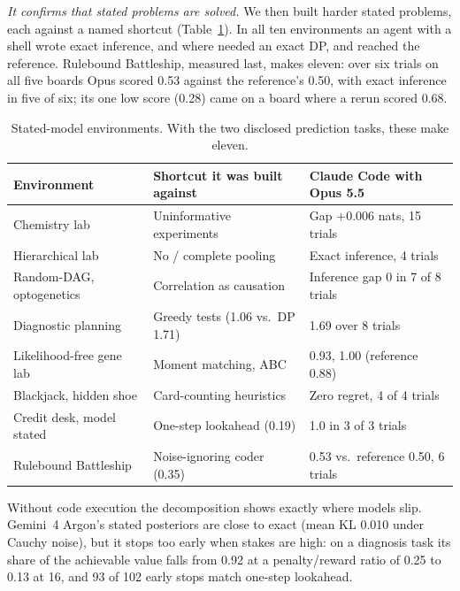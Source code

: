 \documentclass[10pt]{article}
\theoremstyle{definition}
\theoremstyle{remark}
\theoremstyle{plain}
\begin{document}
\emph{It confirms that stated problems are solved.} We then built harder stated problems, each
against a named shortcut (Table~\ref{tab:stated}). In all ten environments an agent with a shell
wrote exact inference, and where needed an exact DP, and reached the reference. Rulebound
Battleship, measured last, makes eleven: over six trials on all five boards Opus scored 0.53
against the reference's 0.50, with exact inference in five of six; its one low score (0.28) came
on a board where a rerun scored 0.68.

\begin{table}[t]
\centering\small
\begin{tabular}{p{3.6cm}p{4.6cm}p{5.6cm}}
\toprule
Environment & Shortcut it was built against & Claude Code with Opus 5.5 \\
\midrule
Chemistry lab & Uninformative experiments & Gap $+0.006$ nats, 15 trials \\
Hierarchical lab & No / complete pooling & Exact inference, 4 trials \\
Random-DAG, optogenetics & Correlation as causation & Inference gap 0 in 7 of 8 trials \\
Diagnostic planning & Greedy tests (1.06 vs.\ DP 1.71) & 1.69 over 8 trials \\
Likelihood-free gene lab & Moment matching, ABC & 0.93, 1.00 (reference 0.88) \\
Blackjack, hidden shoe & Card-counting heuristics & Zero regret, 4 of 4 trials \\
Credit desk, model stated & One-step lookahead (0.19) & 1.0 in 3 of 3 trials \\
Rulebound Battleship & Noise-ignoring coder (0.35) & 0.53 vs.\ reference 0.50, 6 trials \\
\bottomrule
\end{tabular}
\caption{Stated-model environments. With the two disclosed prediction tasks, these make eleven.}
\label{tab:stated}
\end{table}

Without code execution the decomposition shows exactly where models slip. Gemini~4 Argon's
stated posteriors are close to exact (mean KL 0.010 under Cauchy noise), but it stops too early
when stakes are high: on a diagnosis task its share of the achievable value falls from 0.92 at a
penalty/reward ratio of 0.25 to 0.13 at 16, and 93 of 102 early stops match one-step lookahead.
\end{document}
